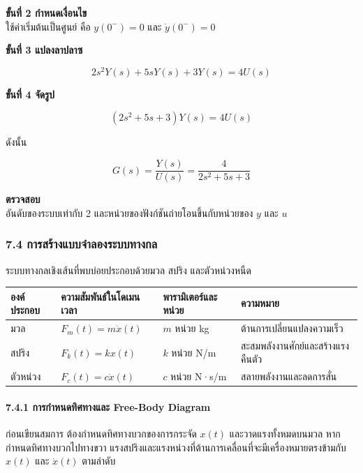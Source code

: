 \textbf{ขั้นที่ 2 กำหนดเงื่อนไข}\\ใช้ค่าเริ่มต้นเป็นศูนย์ คือ $y(0^-)=0$ และ $\dot{y}(0^-)=0$

\textbf{ขั้นที่ 3 แปลงลาปลาซ}

\[
2s^2Y(s)+5sY(s)+3Y(s)=4U(s)
\]

\textbf{ขั้นที่ 4 จัดรูป}

\[
\left(2s^2+5s+3\right)Y(s)=4U(s)
\]

ดังนั้น

\[
G(s)=\frac{Y(s)}{U(s)}=\frac{4}{2s^2+5s+3}
\]

\textbf{ตรวจสอบ}\\อันดับของระบบเท่ากับ 2 และหน่วยของฟังก์ชันถ่ายโอนขึ้นกับหน่วยของ $y$ และ $u$


\subsubsection{7.4 การสร้างแบบจำลองระบบทางกล}

ระบบทางกลเชิงเส้นที่พบบ่อยประกอบด้วยมวล สปริง และตัวหน่วงหนืด

\begin{table}[htbp]
    \centering
    \begin{tabular}{l l l l}
        \hline
        \textbf{องค์ประกอบ} & \textbf{ความสัมพันธ์ในโดเมนเวลา} & \textbf{พารามิเตอร์และหน่วย} & \textbf{ความหมาย} \\
        \hline
        มวล & $F_m(t)=m\ddot{x}(t)$ & $m$ หน่วย kg & ต้านการเปลี่ยนแปลงความเร็ว \\
        สปริง & $F_k(t)=kx(t)$ & $k$ หน่วย N/m & สะสมพลังงานศักย์และสร้างแรงคืนตัว \\
        ตัวหน่วง & $F_c(t)=c\dot{x}(t)$ & $c$ หน่วย N·s/m & สลายพลังงานและลดการสั่น \\
        \hline
    \end{tabular}
\end{table}

\paragraph{7.4.1 การกำหนดทิศทางและ Free-Body Diagram}

ก่อนเขียนสมการ ต้องกำหนดทิศทางบวกของการกระจัด $x(t)$ และวาดแรงทั้งหมดบนมวล หากกำหนดทิศทางบวกไปทางขวา แรงสปริงและแรงหน่วงที่ต้านการเคลื่อนที่จะมีเครื่องหมายตรงข้ามกับ $x(t)$ และ $\dot{x}(t)$ ตามลำดับ

